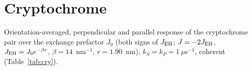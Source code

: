 \documentclass[11pt]{article}
\begin{document}
\begin{table}[h]
\caption{Raw DFT driving force of the contact pair.}
\label{tab:ddft}
\centering

\end{table}

\section{Cryptochrome}
Orientation-averaged, perpendicular and parallel response of the cryptochrome
pair over the exchange prefactor $J_0$ (both signs of $J_{\rm EH}$;
$J = -2J_{\rm EH}$, $J_{\rm EH} = J_0e^{-\beta r}$, $\beta = 14$~nm$^{-1}$,
$r = 1.90$~nm\cite{Efimova2008}), $k_S = k_P = 1~\mu$s$^{-1}$, coherent
(Table~\ref{tab:cry}).

\begin{table}[h]
\caption{Cryptochrome response (\%).}
\label{tab:cry}
\centering

\end{table}



\end{document}
